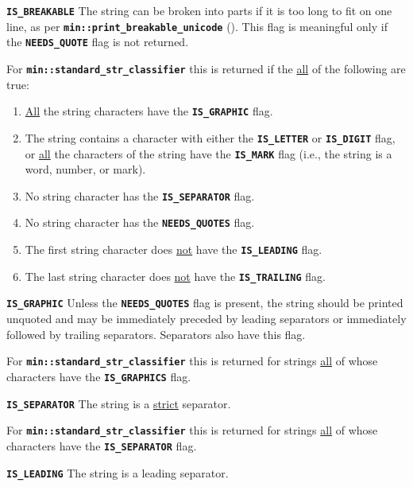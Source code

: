 \documentclass[12pt]{article}
\makeatletter
\newcommand{\TT}[1]{{\tt \bfseries #1}}
\newcommand{\ttmkey}[2]{\TT{#1}\index{#1@{\tt #1}!#2}}
\newcommand{\EOL}{\penalty \exhyphenpenalty}
\newenvironment{itemlist}[1][1.2in]%
	{\begin{list}{}{\setlength{\labelwidth}{#1}%
		        \setlength{\leftmargin}{\labelwidth}%
		        \addtolength{\leftmargin}{+0.2in}%
		        \renewcommand{\makelabel}[1]{##1\hfill}}}%
	{\end{list}}
\makeatother
\begin{document}
\begin{itemlist}[1.5in]
\item[\ttmkey{IS\_BREAKABLE}{{\tt min::str\_classifier} flag}]%
\label{IS_BREAKABLE_CLASSIFIER}
The string can be broken into parts if it is too long to fit on one line,
as per \TT{min::\EOL print\_\EOL breakable\_\EOL unicode}
(\pageref{MIN::PRINT_BREAKABLE_UNICODE}).  This flag is meaningful
only if the \TT{NEEDS\_\EOL QUOTE} flag is not returned.

For \TT{min::\EOL standard\_\EOL str\_\EOL classifier} this is returned
if the \underline{all} of the following are true:
\begin{enumerate}
\item
\underline{All} the string characters have the \TT{IS\_\EOL GRAPHIC} flag.
\item
The string contains a character with either the \TT{IS\_\EOL LETTER}
or \TT{IS\_\EOL DIGIT} flag, or \underline{all} the characters of
the string have the \TT{IS\_\EOL MARK} flag (i.e., the string is
a word, number, or mark).
\item
No string character has the \TT{IS\_\EOL SEPARATOR} flag.
\item
No string character has the \TT{NEEDS\_\EOL QUOTES} flag.
\item
The first string character does \underline{not} have the
\TT{IS\_\EOL LEADING} flag.
\item
The last string character does \underline{not} have the
\TT{IS\_\EOL TRAILING} flag.
\end{enumerate}

\item[\ttmkey{IS\_GRAPHIC}{{\tt min::str\_classifier} flag}]%
\label{IS_GRAPHIC_CLASSIFIER}
Unless the \TT{NEEDS\_QUOTES} flag is present, the string should
be printed unquoted and may be immediately preceded by leading
separators or immediately followed by trailing separators.
Separators also have this flag.

For \TT{min::\EOL standard\_\EOL str\_\EOL classifier} this is
returned for strings \underline{all} of whose characters
have the \TT{IS\_\EOL GRAPHICS} flag.

\item[\ttmkey{IS\_SEPARATOR}{{\tt min::str\_classifier} flag}]%
\label{IS_SEPARATOR_CLASSIFIER}
The string is a \underline{strict} separator.

For \TT{min::\EOL standard\_\EOL str\_\EOL classifier} this is
returned for strings \underline{all} of whose characters
have the \TT{IS\_\EOL SEPARATOR} flag.

\item[\ttmkey{IS\_LEADING}{{\tt min::str\_classifier} flag}]%
\label{IS_LEADING_CLASSIFIER}
The string is a leading separator.


\end{itemlist}
\end{document}

